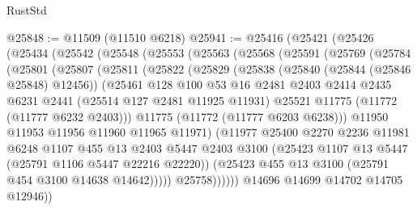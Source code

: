 \begin{lexlean}{RustStd}
\begin{coremodule}
@25848 := @11509 (@11510 @6218)
@25941 := @25416
    (@25421
      (@25426
        (@25434
          (@25542
            (@25548
              (@25553
                (@25563
                  (@25568
                    (@25591
                      (@25769
                        (@25784
                          (@25801
                            (@25807
                              (@25811
                                (@25822
                                  (@25829
                                    (@25838
                                      (@25840 (@25844 (@25846 @25848) @12456))
                                      (@25461
                                        @128
                                        @100
                                        @53
                                        @16
                                        @2481
                                        @2403
                                        @2414
                                        @2435
                                        @6231
                                        @2441
                                        (@25514 @127 @2481 @11925 @11931)
                                        @25521
                                        @11775
                                        (@11772 (@11777 @6232 @2403)))
                                      @11775
                                      (@11772 (@11777 @6203 @6238)))
                                    @11950
                                    @11953
                                    @11956
                                    @11960
                                    @11965
                                    @11971)
                                  (@11977
                                    @25400
                                    @2270
                                    @2236
                                    @11981
                                    @6248
                                    @1107
                                    @455
                                    @13
                                    @2403
                                    @5447
                                    @2403
                                    @3100
                                    (@25423 @1107 @13 @5447 (@25791 @1106 @5447 @22216 @22220))
                                    (@25423 @455 @13 @3100 (@25791 @454 @3100 @14638 @14642)))))
                              @25758))))))
                  @14696
                  @14699
                  @14702
                  @14705
                  @12946))

\end{coremodule}
\end{lexlean}
